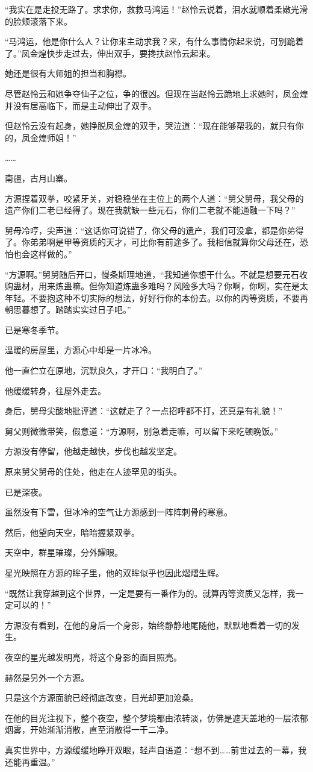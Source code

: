 \begin{this_body}
“我实在是走投无路了。求求你，救救马鸿运！”赵怜云说着，泪水就顺着柔嫩光滑的脸颊滚落下来。

“马鸿运，他是你什么人？让你来主动求我？来，有什么事情你起来说，可别跪着了。”凤金煌快步走过去，伸出双手，要搀扶赵怜云起来。

她还是很有大师姐的担当和胸襟。

尽管赵怜云和她争夺仙子之位，争的很凶。但现在当赵怜云跪地上求她时，凤金煌并没有居高临下，而是主动伸出了双手。

但赵怜云没有起身，她挣脱凤金煌的双手，哭泣道：“现在能够帮我的，就只有你的，凤金煌师姐！”

……

南疆，古月山寨。

方源捏着双拳，咬紧牙关，对稳稳坐在主位上的两个人道：“舅父舅母，我父母的遗产你们二老已经得了。现在我就缺一些元石，你们二老就不能通融一下吗？”

舅母冷哼，尖声道：“这话你可说错了，你父母的遗产，我们可没拿，都是你弟得了。你弟弟啊是甲等资质的天才，可比你有前途多了。我相信就算你父母还在，恐怕也会这样做的。”

“方源啊。”舅舅随后开口，慢条斯理地道，“我知道你想干什么。不就是想要元石收购蛊材，用来炼蛊嘛。但你知道炼蛊多难吗？风险多大吗？你啊，你啊，实在是太年轻。不要抱这种不切实际的想法，好好行你的本份去。以你的丙等资质，不要再朝思暮想了。踏踏实实过日子吧。”

已是寒冬季节。

温暖的房屋里，方源心中却是一片冰冷。

他一直伫立在原地，沉默良久，才开口：“我明白了。”

他缓缓转身，往屋外走去。

身后，舅母尖酸地批评道：“这就走了？一点招呼都不打，还真是有礼貌！”

舅父则微微带笑，假意道：“方源啊，别急着走嘛，可以留下来吃顿晚饭。”

方源没有停留，他越走越快，步伐也越发坚定。

原来舅父舅母的住处，他走在人迹罕见的街头。

已是深夜。

虽然没有下雪，但冰冷的空气让方源感到一阵阵刺骨的寒意。

然后，他望向天空，暗暗握紧双拳。

天空中，群星璀璨，分外耀眼。

星光映照在方源的眸子里，他的双眸似乎也因此熠熠生辉。

“既然让我穿越到这个世界，一定是要有一番作为的。就算丙等资质又怎样，我一定可以的！”

方源没有看到，在他的身后一个身影，始终静静地尾随他，默默地看着一切的发生。

夜空的星光越发明亮，将这个身影的面目照亮。

赫然是另外一个方源。

只是这个方源面貌已经彻底改变，目光却更加沧桑。

在他的目光注视下，整个夜空，整个梦境都由浓转淡，仿佛是遮天盖地的一层浓郁烟雾，开始渐渐消散，直至消散得一干二净。

真实世界中，方源缓缓地睁开双眼，轻声自语道：“想不到……前世过去的一幕，我还能再重温。”

\end{this_body}

